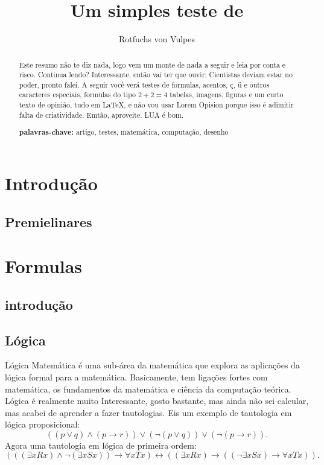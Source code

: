 \documentclass{article}
\title{Um simples teste de \LaTeXe}
\author{Rotfuchs von Vulpes}
\begin{document}
    \maketitle
    \begin{abstract}
        Este resumo não te diz nada, logo vem um monte de nada a seguir e leia por conta e risco. Continua lendo? Interessante, então vai ter que ouvir: Cientistas deviam estar no poder, pronto falei. A seguir você verá testes de formulas, acentos, ç, ü e outros caracteres especiais, formulas do tipo $2+2=4$ tabelas, imagens, figuras e um curto texto de opinião, tudo em \LaTeX, e não vou usar Lorem Opision porque isso é adimitir falta de criatividade. Emtão, aproveite. LUA é bom.
        
        \noindent\textbf{palavras-chave:} artigo, testes, matemática, computação, desenho
    \end{abstract}

    \tableofcontents

    \section{Introdução}
    \subsection{Premielinares}

    \section{Formulas}
    \subsection{introdução}
    \subsection{Lógica}
    Lógica Matemática é uma sub-área da matemática que explora as aplicações da lógica formal para a matemática. Basicamente, tem ligações fortes com matemática, os fundamentos da matemática e ciência da computação teórica.\cite{logica}
    \\Lógica é realmente muito Interessante, gosto bastante, mas ainda não sei calcular, mas acabei de aprender a fazer tautologias. Eis um exemplo de tautologia em lógica proposicional:
    \[
        ((p \lor q) \land (p \rightarrow r)) \lor (\lnot(p \lor q)) \lor (\lnot (p \rightarrow r)).
    \]
    Agora uma tautologia em lógica de primeira ordem:
    \[
        (((\exists x Rx) \land \lnot(\exists x Sx)) \rightarrow \forall x Tx) \leftrightarrow ((\exists x Rx) \rightarrow ((\lnot \exists x Sx) \rightarrow \forall x Tx)).
    \]
\end{document}
